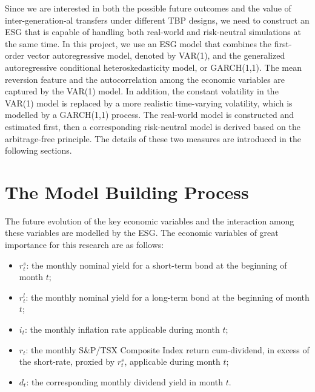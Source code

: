 \documentclass{sfuthesis}
\numberwithin{equation}{chapter}
\begin{document}
	

		\justify
		Since we are interested in both the possible future outcomes and the value of inter-generation-al transfers under different TBP designs, we need to construct an ESG that is capable of handling both real-world and risk-neutral simulations at the same time. In this project, we use an ESG model that combines the first-order vector autoregressive model, denoted by VAR(1), and the generalized autoregressive conditional heteroskedasticity model, or GARCH(1,1). The mean reversion feature and the autocorrelation among the economic variables are captured by the VAR(1) model. In addition, the constant volatility in the VAR(1) model is replaced by a more realistic time-varying volatility, which is modelled by a GARCH(1,1) process. The real-world model is constructed and estimated first, then a corresponding risk-neutral model is derived based on the arbitrage-free principle. The details of these two measures are introduced in the following sections.
	
	
	\section{The Model Building Process}
	\label{The Model Building Process}
	
		\justify
		The future evolution of the key economic variables and the interaction among these variables are modelled by the ESG. The economic variables of great importance for this research are as follows: 
		
		\begin{itemize}
			\item $r_t^{s}$: the monthly nominal yield for a short-term bond at the beginning of month $t$;
			\item $r_t^{l}$: the monthly nominal yield for a long-term bond at the beginning of month $t$;
			\item $i_t$: the monthly inflation rate applicable during month $t$;
			\item $r_t$: the monthly S\&P/TSX Composite Index return cum-dividend, in excess of the short-rate, proxied by $r_t^{s}$, applicable during month $t$;
			\item $d_t$: the corresponding monthly dividend yield in month $t$.
		\end{itemize}
	
	
	
\end{document}
